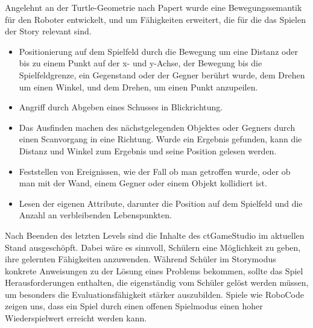 Angelehnt an der Turtle-Geometrie nach Papert wurde eine Bewegungssemantik für den Roboter
entwickelt, und um Fähigkeiten erweitert, die für die das Spielen der Story relevant sind.

\begin{itemize}
\item Positionierung auf dem Spielfeld durch die Bewegung um eine Distanz oder bis zu einem Punkt
auf der x- und y-Achse, der Bewegung bis die Spielfeldgrenze, ein Gegenstand oder der Gegner berührt wurde, dem Drehen um einen
Winkel, und dem Drehen, um einen Punkt anzupeilen.
\item Angriff durch Abgeben eines Schusses in Blickrichtung.
\item Das Ausfinden machen des nächstgelegenden Objektes oder Gegners durch einen Scanvorgang in eine Richtung. Wurde
  ein Ergebnis gefunden, kann die Distanz und Winkel zum Ergebnis und seine Position gelesen werden.
\item Feststellen von Ereignissen, wie der Fall ob man getroffen wurde, oder ob man mit der Wand,
  einem Gegner oder einem Objekt kollidiert ist.
\item Lesen der eigenen Attribute, darunter die Position auf dem Spielfeld und die Anzahl an
verbleibenden Lebenspunkten.
\end{itemize}

Nach Beenden des letzten Levels sind die Inhalte des ctGameStudio im aktuellen Stand ausgeschöpft.
Dabei wäre es sinnvoll, Schülern eine Möglichkeit zu geben, ihre gelernten Fähigkeiten anzuwenden.
Während Schüler im Storymodus konkrete Anweisungen zu der Lösung eines Problems bekommen, sollte das
Spiel Herausforderungen enthalten, die eigenständig vom Schüler gelöst werden müssen, um besonders
die Evaluationsfähigkeit stärker auszubilden. Spiele wie RoboCode zeigen uns, dass ein Spiel durch
einen offenen Spielmodus einen hoher Wiederspielwert erreicht werden kann.
